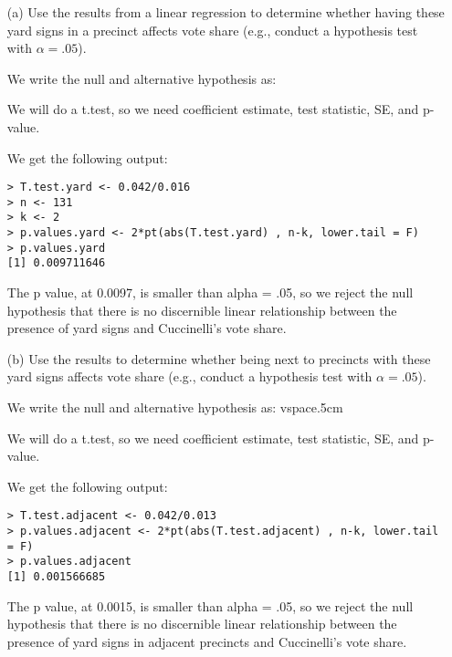 \documentclass[12pt,letterpaper]{article}
\begin{document}
\vspace{.5cm}
\begin{enumerate}
	\item [(a)] Use the results from a linear regression to determine whether having these yard signs in a precinct affects vote share (e.g., conduct a hypothesis test with $\alpha = .05$).

\noindent We write the null and alternative hypothesis as:
\vspace{.5cm}
  
\vspace{.5cm}   
\noindent We will do a t.test, so we need coefficient estimate, test statistic, SE, and p-value.
\vspace{.5cm}
  
\vspace{.5cm}   
\noindent We get the following output:
\begin{verbatim}
> T.test.yard <- 0.042/0.016
> n <- 131
> k <- 2
> p.values.yard <- 2*pt(abs(T.test.yard) , n-k, lower.tail = F)
> p.values.yard
[1] 0.009711646
\end{verbatim}
\noindent The p value, at 0.0097, is smaller than alpha = .05, so we reject the null hypothesis that there is no discernible linear relationship between the presence of yard signs and Cuccinelli's vote share.

	\newpage		
	\item [(b)]  Use the results to determine whether being
	next to precincts with these yard signs affects vote
	share (e.g., conduct a hypothesis test with $\alpha = .05$).

\noindent We write the null and alternative hypothesis as:
vspace{.5cm}
  
\vspace{.5cm}  
\noindent We will do a t.test, so we need coefficient estimate, test statistic, SE, and p-value.
\vspace{.5cm}
  
\vspace{.5cm}   
\noindent We get the following output:
\begin{verbatim}
> T.test.adjacent <- 0.042/0.013
> p.values.adjacent <- 2*pt(abs(T.test.adjacent) , n-k, lower.tail = F)
> p.values.adjacent
[1] 0.001566685
\end{verbatim}
\noindent The p value, at 0.0015, is smaller than alpha = .05, so we reject the null hypothesis that there is no discernible linear relationship between the presence of yard signs in adjacent precincts and Cuccinelli's vote share.
	

\end{enumerate}
\end{document}
